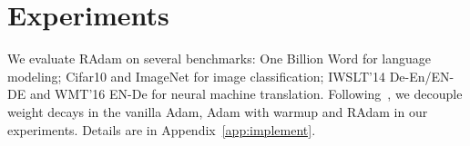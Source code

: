 
\vspace{-0.1cm}
\section{Experiments}
\vspace{-0.1cm}

We evaluate RAdam on several benchmarks:
One Billion Word for language modeling; Cifar10 and ImageNet for image classification; IWSLT'14 De-En/EN-DE and WMT'16 EN-De for neural machine translation.
Following~\cite{loshchilov2017fixing}, we decouple weight decays in the vanilla Adam, Adam with warmup and RAdam 
in our experiments.  Details are in Appendix~\ref{app:implement}.

